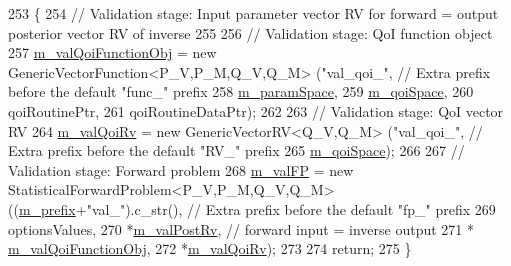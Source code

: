 \begin{DoxyCode}
253 \{
254   \textcolor{comment}{// Validation stage: Input parameter vector RV for forward = output posterior vector RV of inverse}
255 
256   \textcolor{comment}{// Validation stage: QoI function object}
257   \hyperlink{class_q_u_e_s_o_1_1_validation_cycle_a35443093bebe1ddbab7fa7cb671be562}{m\_valQoiFunctionObj} = \textcolor{keyword}{new} GenericVectorFunction<P\_V,P\_M,Q\_V,Q\_M> (\textcolor{stringliteral}{"val\_qoi\_"}, \textcolor{comment}{// Extra
       prefix before the default "func\_" prefix}
258                                                                            
      \hyperlink{class_q_u_e_s_o_1_1_validation_cycle_a641d2e59aed41a93a787c71ec30b6e07}{m\_paramSpace},
259                                                                            
      \hyperlink{class_q_u_e_s_o_1_1_validation_cycle_adccd6175c04258a6f603a92a7ae4327c}{m\_qoiSpace},
260                                                                            qoiRoutinePtr,
261                                                                            qoiRoutineDataPtr);
262 
263   \textcolor{comment}{// Validation stage: QoI vector RV}
264   \hyperlink{class_q_u_e_s_o_1_1_validation_cycle_a930f8140c5ba8655ea6ce926acc6ceef}{m\_valQoiRv} = \textcolor{keyword}{new} GenericVectorRV<Q\_V,Q\_M> (\textcolor{stringliteral}{"val\_qoi\_"}, \textcolor{comment}{// Extra prefix before the default "RV\_"
       prefix}
265                                                     \hyperlink{class_q_u_e_s_o_1_1_validation_cycle_adccd6175c04258a6f603a92a7ae4327c}{m\_qoiSpace});
266 
267   \textcolor{comment}{// Validation stage: Forward problem}
268   \hyperlink{class_q_u_e_s_o_1_1_validation_cycle_ac1ba4bc21405b92f9bce23e8579e5c70}{m\_valFP} = \textcolor{keyword}{new} StatisticalForwardProblem<P\_V,P\_M,Q\_V,Q\_M> ((\hyperlink{class_q_u_e_s_o_1_1_validation_cycle_adcc61017a11c99f3a6189ddbf7bc76fc}{m\_prefix}+\textcolor{stringliteral}{"val\_"}).c\_str(),      
       \textcolor{comment}{// Extra prefix before the default "fp\_" prefix}
269                                                                    optionsValues,
270                                                                    *\hyperlink{class_q_u_e_s_o_1_1_validation_cycle_a196610836330a456a21c4f3b6ec56883}{m\_valPostRv}, \textcolor{comment}{// forward
       input = inverse output}
271                                                                    *
      \hyperlink{class_q_u_e_s_o_1_1_validation_cycle_a35443093bebe1ddbab7fa7cb671be562}{m\_valQoiFunctionObj},
272                                                                    *\hyperlink{class_q_u_e_s_o_1_1_validation_cycle_a930f8140c5ba8655ea6ce926acc6ceef}{m\_valQoiRv});
273 
274   \textcolor{keywordflow}{return};
275 \}
\end{DoxyCode}

